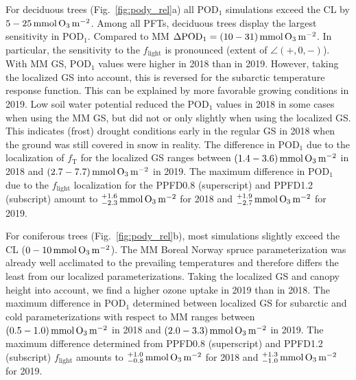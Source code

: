 \documentclass[bg, manuscript]{copernicus}
\begin{document}
For deciduous trees (Fig.~\ref{fig:pody_rel}a) all $\mathrm{POD_1}$ simulations exceed the CL by $5-25\,\unit{mmol\,\chem{O_3}\,m^{-2}}$. Among all PFTs, deciduous trees display the largest sensitivity in $\mathrm{POD_1}$. Compared to MM $\Delta\mathrm{POD_1}=(10-31)\,\unit{mmol\,\chem{O_3}\,m^{-2}}$. In particular, the sensitivity to the $f_\mathrm{light}$ is pronounced (extent of $\angle(+,0,-)$). With MM GS, $\mathrm{POD_1}$ values were higher in 2018 than in 2019. However, taking the localized GS into account, this is reversed for the subarctic temperature response function. This can be explained by more favorable growing conditions in 2019. Low soil water potential reduced the $\mathrm{POD_1}$ values in 2018 in some cases when using the MM GS, but did not or only slightly when using the localized GS. This indicates (frost) drought conditions early in the regular GS in 2018 when the ground was still covered in snow in reality. The difference in $\mathrm{POD_1}$ due to the localization of $f_\mathrm{T}$ for the localized GS ranges between $(1.4-3.6)\,\unit{mmol\,\chem{O_3}\,m^{-2}}$ in 2018 and $(2.7-7.7)\,\unit{mmol\,\chem{O_3}\,m^{-2}}$ in 2019. The maximum difference in $\mathrm{POD_1}$ due to the $f_\mathrm{light}$ localization for the PPFD0.8 (superscript) and PPFD1.2 (subscript) amount to $^{+1.6}_{-2.3}\,\unit{mmol\,\chem{O_3}\,m^{-2}}$ for 2018 and $^{+1.9}_{-2.7}\,\unit{mmol\,\chem{O_3}\,m^{-2}}$ for 2019. 

For coniferous trees (Fig.~\ref{fig:pody_rel}b), most simulations slightly exceed the CL ($0-10\,\unit{mmol\,\chem{O_3}\,m^{-2}}$). The MM Boreal Norway spruce parameterization was already well acclimated to the prevailing temperatures and therefore differs the least from our localized parameterizations. Taking the localized GS and canopy height into account, we find a higher ozone uptake in 2019 than in 2018. The maximum difference in $\mathrm{POD_1}$ determined between localized GS for subarctic and cold parameterizations with respect to MM ranges between $(0.5-1.0)\,\unit{mmol\,\chem{O_3}\,m^{-2}}$ in 2018 and $(2.0-3.3)\,\unit{mmol\,\chem{O_3}\,m^{-2}}$ in 2019. The maximum difference determined from PPFD0.8 (superscript) and PPFD1.2 (subscript) $f_\mathrm{light}$ amounts to $^{+1.0}_{-0.8}\,\unit{mmol\,\chem{O_3}\,m^{-2}}$ for 2018 and $^{+1.3}_{-1.0}\,\unit{mmol\,\chem{O_3}\,m^{-2}}$ for 2019.
\end{document}
